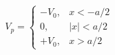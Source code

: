 \begin{equation}
V_{p}=\left\{
\begin{array}{cc}
-V_{0}, & x<-a/2 \\
0, & |x|<a/2 \\
+V_{0}, & x>a/2
\end{array}
\right.  \label{eq40}
\end{equation}

